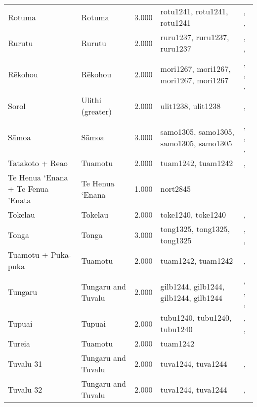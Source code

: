 \begin{longtable}{p{1.8cm}p{1.8cm}p{1.8cm}p{2cm}p{7cm}}
  Rotuma & Rotuma & 3.000 & rotu1241, rotu1241, rotu1241 & \citet{gardiner1898natives}, \citet{howard1963conservatism}, \citet{howard1991} \\ 
  Rurutu & Rurutu & 2.000 & ruru1237, ruru1237, ruru1237 & \citet{aitken1930ethnology}, \citet{bollt2008excavations}, \citet{edwards2003archaeological} \\ 
  Rēkohou & Rēkohou & 2.000 & mori1267, mori1267, mori1267, mori1267 & \citet{sahlins1958social}, \citet{Buck PH (1952) The Coming of the Maori (Whitcombe and Tombs: Wellington, New Zealand).}, \citet{kirch1984evolution}, \citet{van1995maori} \\ 
  Sorol & Ulithi (greater) & 2.000 & ulit1238, ulit1238 & \citet{lessa1950}, \citet{lessa1966} \\ 
  Sāmoa & Sāmoa & 3.000 & samo1305, samo1305, samo1305, samo1305 & \citet{sahlins1958social}, \citet{buck1930}, \citet{keesing1934}, \citet{watters_1958} \\ 
  Tatakoto + Reao & Tuamotu & 2.000 & tuam1242, tuam1242 & \citet{emory1975material}, \citet{emory1975material} \\ 
  Te Henua ‘Enana + Te Fenua ’Enata & Te Henua ‘Enana & 1.000 & nort2845 & \citet{sahlins1958social} \\ 
  Tokelau & Tokelau & 2.000 & toke1240, toke1240 & \citet{hooper1973demographic}, \citet{macgregor1937} \\ 
  Tonga & Tonga & 3.000 & tong1325, tong1325, tong1325 & \citet{kirch1984evolution}, \citet{cummins1977tongan}, \citet{ferdon1988early} \\ 
  Tuamotu + Puka-puka & Tuamotu & 2.000 & tuam1242, tuam1242 & \citet{emory1975material}, \citet{emory1975material} \\ 
  Tungaru & Tungaru and Tuvalu & 2.000 & gilb1244, gilb1244, gilb1244, gilb1244 & \citet{lambert1966}, \citet{lambert1975makin}, \citet{lambert1991}, \citet{macdonald1982cinderellas} \\ 
  Tupuai & Tupuai & 2.000 & tubu1240, tubu1240, tubu1240 & \citet{aitken1930ethnology}, \citet{bollt2008excavations}, \citet{edwards2003archaeological} \\ 
  Tureia & Tuamotu & 2.000 & tuam1242 & \citet{emory1975material} \\ 
  Tuvalu 31 & Tungaru and Tuvalu & 2.000 & tuva1244, tuva1244 & \citet{macdonald1982cinderellas}, \citet{goldsmith1991} \\ 
  Tuvalu 32 & Tungaru and Tuvalu & 2.000 & tuva1244, tuva1244 & \citet{macdonald1982cinderellas}, \citet{goldsmith1991} \\ 

\end{longtable}
